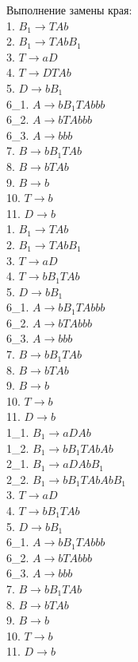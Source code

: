 \documentclass[a4paper,14pt]{extarticle}
\begin{document}
\begin{enumerate}[1.]
Выполнение замены края:\\
1. $B_1 \rightarrow TAb$\\
2. $B_1 \rightarrow TAbB_1$\\
3. $T \rightarrow aD$\\ 
4. $T \rightarrow DTAb$\\
5. $D \rightarrow bB_1$\\
6\_1. $A \rightarrow bB_1TAbbb$\\
6\_2. $A \rightarrow bTAbbb$\\
6\_3. $A \rightarrow bbb$\\
7. $B \rightarrow bB_1TAb$\\ 
8. $B \rightarrow bTAb$\\ 
9. $B \rightarrow b$\\
10. $T \rightarrow b$\\
11. $D \rightarrow b$\\

1. $B_1 \rightarrow TAb$\\
2. $B_1 \rightarrow TAbB_1$\\
3. $T \rightarrow aD$\\ 
4. $T \rightarrow bB_1TAb$\\
5. $D \rightarrow bB_1$\\
6\_1. $A \rightarrow bB_1TAbbb$\\
6\_2. $A \rightarrow bTAbbb$\\
6\_3. $A \rightarrow bbb$\\
7. $B \rightarrow bB_1TAb$\\ 
8. $B \rightarrow bTAb$\\ 
9. $B \rightarrow b$\\
10. $T \rightarrow b$\\
11. $D \rightarrow b$\\

1\_1. $B_1 \rightarrow aDAb$\\
1\_2. $B_1 \rightarrow bB_1TAbAb$\\
2\_1. $B_1 \rightarrow aDAbB_1$\\
2\_2. $B_1 \rightarrow bB_1TAbAbB_1$\\
3. $T \rightarrow aD$\\ 
4. $T \rightarrow bB_1TAb$\\
5. $D \rightarrow bB_1$\\
6\_1. $A \rightarrow bB_1TAbbb$\\
6\_2. $A \rightarrow bTAbbb$\\
6\_3. $A \rightarrow bbb$\\
7. $B \rightarrow bB_1TAb$\\ 
8. $B \rightarrow bTAb$\\ 
9. $B \rightarrow b$\\
10. $T \rightarrow b$\\
11. $D \rightarrow b$\\


\end{enumerate}
\end{document}
